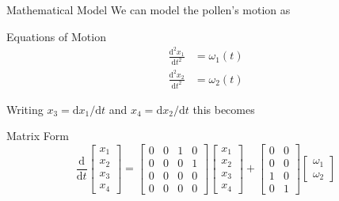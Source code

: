 \documentclass[presentation]{beamer}
\begin{document}
\begin{frame}{Mathematical Model}
  We can model the pollen's motion as

  \begin{block}{Equations of Motion}
    $$
    \begin{aligned}
      \frac{\mathrm{d}^2 x_1}{\mathrm{d}t^2} &= \omega_1(t) \\
      \frac{\mathrm{d}^2 x_2}{\mathrm{d}t^2} &= \omega_2(t)
    \end{aligned}
    $$
  \end{block}

  Writing $x_3 = \mathrm{d}x_1 / \mathrm{d}t$ and
  $x_4 = \mathrm{d}x_2 / \mathrm{d}t$ this becomes

  \begin{block}{Matrix Form}
  $$
  \frac{\mathrm{d}}{\mathrm{d}t}\begin{bmatrix}x_1 \\ x_2 \\ x_3 \\ x_4\end{bmatrix} =
  \begin{bmatrix}
    0 & 0 & 1 & 0 \\
    0 & 0 & 0 & 1 \\
    0 & 0 & 0 & 0 \\
    0 & 0 & 0 & 0
  \end{bmatrix}
  \begin{bmatrix}x_1 \\ x_2 \\ x_3 \\ x_4\end{bmatrix} +
  \begin{bmatrix}
    0 & 0 \\
    0 & 0 \\
    1 & 0 \\
    0 & 1
  \end{bmatrix}
  \begin{bmatrix}\omega_1 \\ \omega_2\end{bmatrix}
  $$
  \end{block}

\end{frame}
\end{document}
